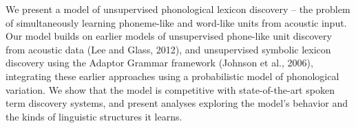 We present a model of unsupervised phonological lexicon discovery -- the problem of simultaneously learning phoneme-like and word-like units from acoustic input. Our model builds on earlier models of unsupervised phone-like unit discovery from acoustic data (Lee and Glass, 2012), and unsupervised symbolic lexicon discovery using the Adaptor Grammar framework (Johnson et al., 2006), integrating these earlier approaches using a probabilistic model of phonological variation. We show that the model is competitive with state-of-the-art spoken term discovery systems, and present analyses exploring the model's behavior and the kinds of linguistic structures it learns.
